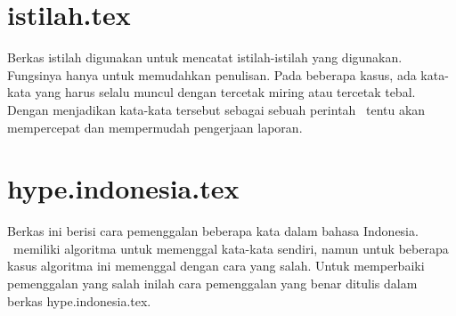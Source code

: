 \section{istilah.tex}
Berkas istilah digunakan untuk mencatat istilah-istilah yang digunakan. 
Fungsinya hanya untuk memudahkan penulisan.
Pada beberapa kasus, ada kata-kata yang harus selalu muncul dengan tercetak 
miring atau tercetak tebal. 
Dengan menjadikan kata-kata tersebut sebagai sebuah perintah \latex~tentu akan 
mempercepat dan mempermudah pengerjaan laporan. 


\section{hype.indonesia.tex}
Berkas ini berisi cara pemenggalan beberapa kata dalam bahasa Indonesia. 
\latex~memiliki algoritma untuk memenggal kata-kata sendiri, namun untuk 
beberapa kasus algoritma ini memenggal dengan cara yang salah. 
Untuk memperbaiki pemenggalan yang salah inilah cara pemenggalan yang benar 
ditulis dalam berkas hype.indonesia.tex.


